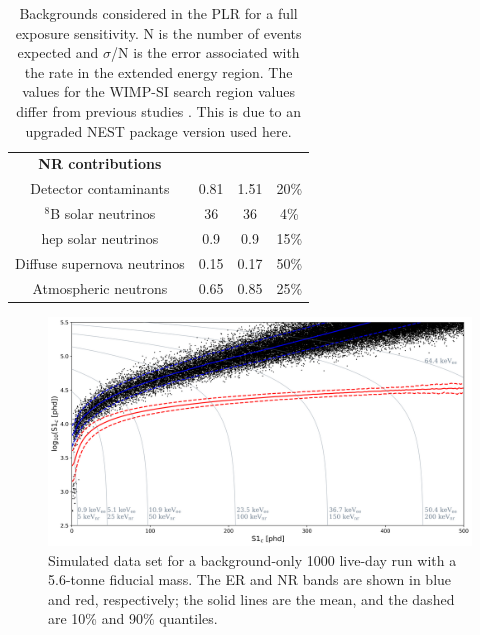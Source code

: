 \begin{table}[]
\begin{tabular}{c|c|c|c}
        \textbf{NR contributions}                    &                        &                         &   \\
        Detector contaminants                        & 0.81                   & 1.51                    & 20\% \cite{LZ_projected_sensitivity_paper_ref}         \\
        ${}^{8}$B solar neutrinos                    & 36                     & 36                      & 4\%  \cite{b8_neutrino_rate_ref}       \\
        hep solar neutrinos                          & 0.9                    & 0.9                     & 15\% \cite{solar_neutrinos_rate_ref, pp_solar_neutrinos_rate_ref}        \\
        Diffuse supernova neutrinos                  & 0.15                   & 0.17                    & 50\% \cite{dissuse_supernova_neutrinos_rate_ref}        \\
        Atmospheric neutrons                         & 0.65                   & 0.85                    & 25\% \cite{atmospheric_neutrinos_rate_ref}      
    \end{tabular}
    \caption{Backgrounds considered in the PLR for a full exposure sensitivity. N is the number of events expected and $\sigma$/N is the error associated with the rate in the extended energy region.
    The values for the WIMP-SI search region values differ from previous studies \cite{LZ_projected_sensitivity_paper_ref,LZ_Ibles_LZStats_Thesis_ref}. This is due to an upgraded NEST package version used here.}
    \label{tab:projected_lz_backgrounds}
\end{table}



\begin{figure}
    \centering
    \includegraphics[width=15cm]{Figures/EFT/Projected_backgrounds/projected_backgrounds_s1_s2.png}
    \caption{Simulated data set for a background-only 1000 live-day run with a 5.6-tonne fiducial mass. The ER and NR bands are shown in blue and red, respectively; the solid lines are the mean, and the dashed are 10\% and 90\% quantiles.}
    \label{fig:projected_background_dataset}
\end{figure}

